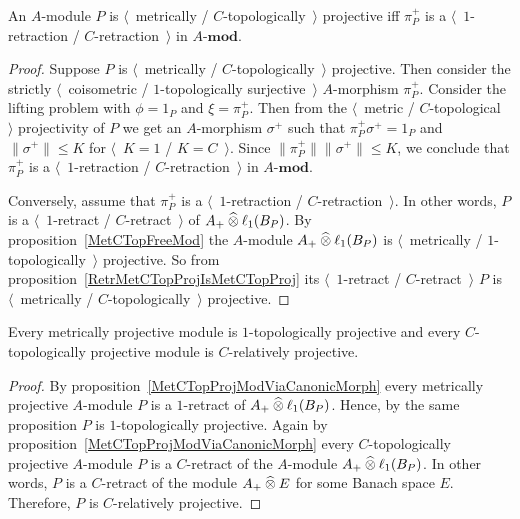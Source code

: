 \begin{proposition}\label{MetCTopProjModViaCanonicMorph} 
An $A$-module $P$ is
$\langle$~metrically / $C$-topologically~$\rangle$ projective iff $\pi_P^+$ is 
a $\langle$~$1$-retraction / $C$-retraction~$\rangle$ in $A\text{-}\mathbf{mod}$.
\end{proposition}
\begin{proof}
Suppose $P$ is 
$\langle$~metrically / $C$-topologically~$\rangle$ projective. Then consider 
the strictly $\langle$~coisometric / $1$-topologically surjective~$\rangle$
$A$-morphism $\pi_P^+$. Consider the lifting problem with $\phi=1_P$ 
and $\xi=\pi_P^+$. Then from the $\langle$~metric / $C$-topological~$\rangle$ 
projectivity of $P$ we get an $A$-morphism $\sigma^+$ such 
that $\pi_P^+\sigma^+=1_P$
and $\lVert\sigma^+\rVert\leq K$ for $\langle$~$K=1$ / $K=C$~$\rangle$.
Since $\lVert\pi_P^+\rVert\lVert \sigma^+\rVert\leq K$, 
we conclude that $\pi_P^+$ is a
$\langle$~$1$-retraction / $C$-retraction~$\rangle$ in $A\text{-}\mathbf{mod}$.

Conversely, assume that $\pi_P^+$ is 
a $\langle$~$1$-retraction / $C$-retraction~$\rangle$. In other words, $P$ is 
a $\langle$~$1$-retract / $C$-retract~$\rangle$ of $A_+\mathbin{\widehat{\otimes}} \ell_1(B_P)$. 
By proposition~\ref{MetCTopFreeMod} the $A$-module $A_+\mathbin{\widehat{\otimes}} \ell_1(B_P)$ 
is $\langle$~metrically / $1$-topologically~$\rangle$ projective. So from 
proposition~\ref{RetrMetCTopProjIsMetCTopProj} 
its $\langle$~$1$-retract / $C$-retract~$\rangle$ $P$ is 
$\langle$~metrically / $C$-topologically~$\rangle$ projective.
\end{proof}

\begin{proposition}\label{MetProjIsTopProjAndTopProjIsRelProj} Every metrically
projective module is $1$-topologically projective and every $C$-topologically 
projective module is $C$-relatively projective.
\end{proposition}
\begin{proof} By proposition~\ref{MetCTopProjModViaCanonicMorph} every 
metrically projective $A$-module $P$ is a $1$-retract 
of $A_+\mathbin{\widehat{\otimes}} \ell_1(B_P)$. Hence, by the same proposition $P$ 
is $1$-topologically projective. Again by 
proposition~\ref{MetCTopProjModViaCanonicMorph} every $C$-topologically 
projective $A$-module $P$ is a $C$-retract of the $A$-module $A_+\mathbin{\widehat{\otimes}} \ell_1(B_P)$. 
In other words, $P$ is a $C$-retract of the module $A_+\mathbin{\widehat{\otimes}} E$ for some Banach
space $E$. Therefore, $P$ is $C$-relatively projective.
\end{proof}


